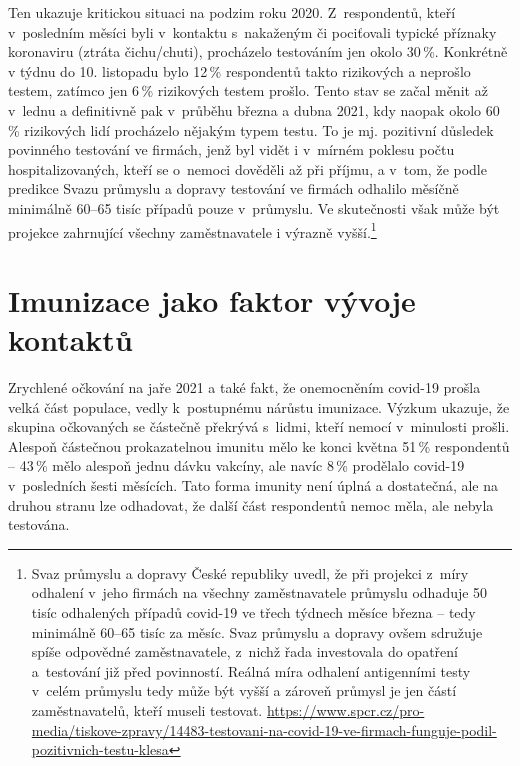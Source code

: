 Ten ukazuje kritickou situaci na podzim roku 2020. Z respondentů, kteří v posledním měsíci byli v kontaktu s nakaženým či pociťovali typické příznaky koronaviru (ztráta čichu/chuti), procházelo testováním jen okolo 30\,\%. Konkrétně v týdnu do 10. listopadu bylo 12\,\% respondentů takto rizikových a neprošlo testem, zatímco jen 6\,\% rizikových testem prošlo. Tento stav se začal měnit až v lednu a definitivně pak v průběhu března a dubna 2021, kdy naopak okolo 60\,\% rizikových lidí procházelo nějakým typem testu. To je mj. pozitivní důsledek
povinného testování ve firmách, jenž byl vidět i v mírném poklesu počtu hospitalizovaných, kteří se o~nemoci dověděli až při příjmu, a v tom, že podle predikce Svazu průmyslu a dopravy testování ve firmách odhalilo měsíčně minimálně 60--65 tisíc případů pouze v průmyslu. Ve skutečnosti však může být projekce zahrnující všechny zaměstnavatele i výrazně vyšší.\footnote{Svaz průmyslu a dopravy České republiky uvedl, že při projekci z míry odhalení v jeho firmách na všechny zaměstnavatele průmyslu odhaduje 50 tisíc odhalených případů covid-19 ve třech týdnech měsíce března – tedy minimálně 60--65 tisíc za měsíc. Svaz průmyslu a dopravy ovšem sdružuje spíše odpovědné zaměstnavatele, z nichž řada investovala do opatření a testování již před povinností. Reálná míra odhalení antigenními testy v celém průmyslu tedy může být vyšší a zároveň průmysl je jen částí zaměstnavatelů, kteří museli testovat. \url{https://www.spcr.cz/pro-media/tiskove-zpravy/14483-testovani-na-covid-19-ve-firmach-funguje-podil-pozitivnich-testu-klesa}}

\section*{Imunizace jako faktor vývoje kontaktů}

Zrychlené očkování na jaře 2021 a také fakt, že onemocněním covid-19 prošla velká část populace, vedly k postupnému nárůstu imunizace. Výzkum  ukazuje, že skupina očkovaných se částečně překrývá s lidmi, kteří nemocí v minulosti prošli. Alespoň částečnou prokazatelnou imunitu mělo ke konci května 51\,\% respondentů – 43\,\% mělo alespoň jednu dávku vakcíny, ale navíc 8\,\% prodělalo covid-19 v posledních šesti měsících. Tato forma imunity není úplná a dostatečná, ale na druhou stranu lze odhadovat, že další část respondentů nemoc měla, ale nebyla testována.

